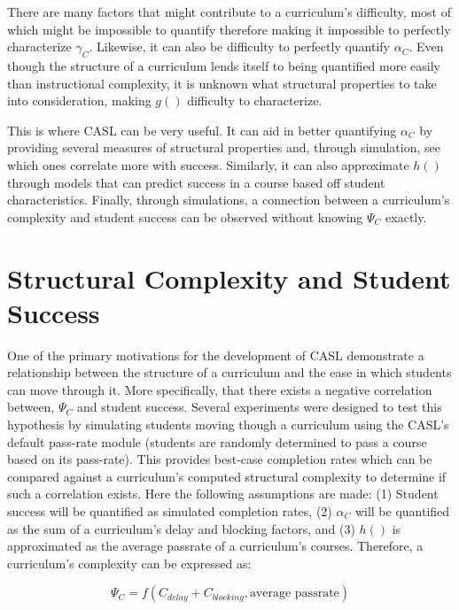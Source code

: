 \documentclass[botnum, fleqn]{unmeethesis}
\begin{document}
    There are many factors that might contribute to a curriculum's difficulty, most of which might be impossible to quantify therefore making it impossible to perfectly characterize $\gamma_C$. Likewise, it can also be difficulty to perfectly quantify $\alpha_C$. Even though the structure of a curriculum lends itself to being quantified more easily than instructional complexity, it is unknown what structural properties to take into consideration, making $g()$ difficulty to characterize.

    This is where CASL can be very useful. It can aid in better quantifying $\alpha_C$ by providing several measures of structural properties and, through simulation, see which ones correlate more with success. Similarly, it can also approximate $h()$ through models that can predict success in a course based off student characteristics. Finally, through simulations, a connection between a curriculum's complexity and student success can be observed without knowing $\Psi_C$ exactly.


  \section{Structural Complexity and Student Success}
    One of the primary motivations for the development of CASL demonstrate a relationship between the structure of a curriculum and the ease in which students can move through it. More specifically, that there exists a negative correlation between, $\Psi_C$ and student success. Several experiments were designed to test this hypothesis by simulating students moving though a curriculum using the CASL's default pass-rate module (students are randomly determined to pass a course based on its pass-rate). This provides best-case completion rates which can be compared against a curriculum's computed structural complexity to determine if such a correlation exists. Here the following assumptions are made: (1) Student success will be quantified as simulated completion rates, (2) $\alpha_C$ will be quantified as the sum of a curriculum's delay and blocking factors, and (3) $h()$ is approximated as the average passrate of a curriculum's courses. Therefore, a curriculum's complexity can be expressed as:

    \[
      \Psi_C = f( C_{delay} + C_{blocking}, \mbox{average passrate})
    \]

\end{document}
